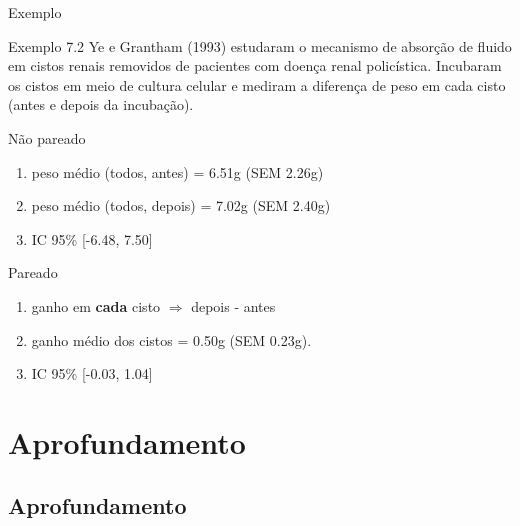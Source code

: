 \documentclass{beamer}
\begin{document}
\begin{frame}{Exemplo}
  \begin{exampleblock}{Exemplo 7.2}
    \footnotesize
    Ye e Grantham (1993) estudaram o mecanismo de absorção de fluido em cistos renais removidos de pacientes com doença renal policística.
    Incubaram os cistos em meio de cultura celular e mediram a diferença de peso em cada cisto (antes e depois da incubação).

    \scriptsize
    \begin{exampleblock}{Não pareado}
      \begin{enumerate}
      \item<2,4> peso médio (todos, antes) = 6.51g (SEM 2.26g)
      \item<2,4> peso médio (todos, depois) = 7.02g (SEM 2.40g)
      \item<2,4> IC 95\% [-6.48, 7.50]
      \end{enumerate}
    \end{exampleblock}
    \begin{exampleblock}{Pareado}
      \begin{enumerate}
      \item<3,4> ganho em {\bf cada} cisto $\Rightarrow$ depois - antes
      \item<3,4> ganho médio dos cistos = 0.50g (SEM 0.23g).
      \item<3,4> IC 95\% [-0.03, 1.04]
      \end{enumerate}
    \end{exampleblock}
  \end{exampleblock}
\end{frame}

\section{Aprofundamento}

\subsection{Aprofundamento}
\end{document}
